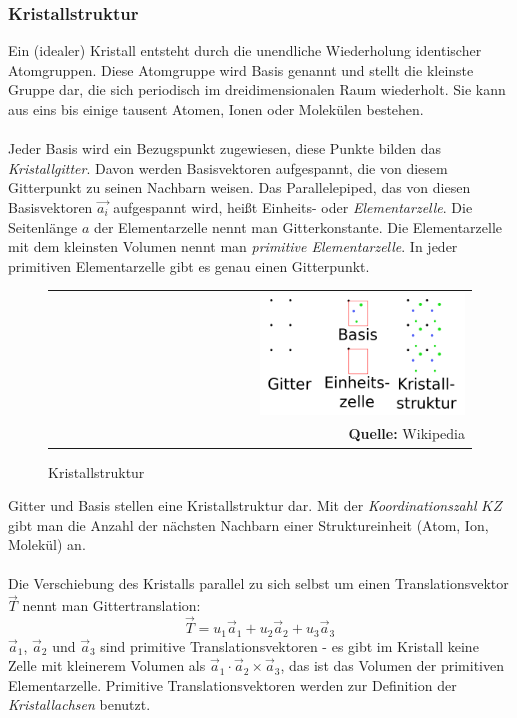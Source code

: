 \documentclass[a4paper,titlepage]{scrartcl}
\numberwithin{equation}{section}
\begin{document}
\subsubsection{Kristallstruktur}
Ein (idealer) Kristall entsteht durch die unendliche Wiederholung identischer Atomgruppen. Diese Atomgruppe wird Basis genannt und stellt die kleinste Gruppe dar, die sich periodisch im dreidimensionalen Raum wiederholt. Sie kann aus eins bis einige tausent Atomen, Ionen oder Molekülen bestehen.\\ \\
Jeder Basis wird ein Bezugspunkt zugewiesen, diese Punkte bilden das \emph{Kristallgitter}. Davon werden Basisvektoren aufgespannt, die von diesem Gitterpunkt zu seinen Nachbarn weisen. Das Parallelepiped, das von diesen Basisvektoren $\vec{a_i}$ aufgespannt wird,  heißt Einheits- oder \emph{Elementarzelle}. Die Seitenlänge $a$ der Elementarzelle nennt man Gitterkonstante. Die Elementarzelle mit dem kleinsten Volumen nennt man \emph{primitive Elementarzelle}. In jeder primitiven Elementarzelle gibt es genau einen Gitterpunkt.
\begin{figure}[H]
	\centering
	\begin{tabular}{@{}r@{}}
		\includegraphics[width=0.5\textwidth]{images/kristallstruktur.png}\\
		\footnotesize\sffamily\textbf{Quelle:} Wikipedia \cite{wiki:kristallstruktur}
	\end{tabular}
	\caption{Kristallstruktur}
    \label{fig:kristallstruktur}
\end{figure}
Gitter und Basis stellen eine Kristallstruktur dar. Mit der \emph{Koordinationszahl} $KZ$ gibt man die Anzahl der nächsten Nachbarn einer Struktureinheit (Atom, Ion, Molekül) an.\\ \\
Die Verschiebung des Kristalls parallel zu sich selbst um einen Translationsvektor $\vec{T}$ nennt man Gittertranslation:
\begin{equation*}
\vec{T}=u_1 \vec{a}_1 + u_2 \vec{a}_2 + u_3 \vec{a}_3
\end{equation*}
$\vec{a}_1$, $\vec{a}_2$ und $\vec{a}_3$ sind primitive Translationsvektoren - es gibt im Kristall keine Zelle mit kleinerem Volumen als $\vec{a}_1 \cdot \vec{a}_2 \times \vec{a}_3$, das ist das Volumen der primitiven Elementarzelle. Primitive Translationsvektoren werden zur Definition der \emph{Kristallachsen} benutzt.\\ \\
\end{document}
